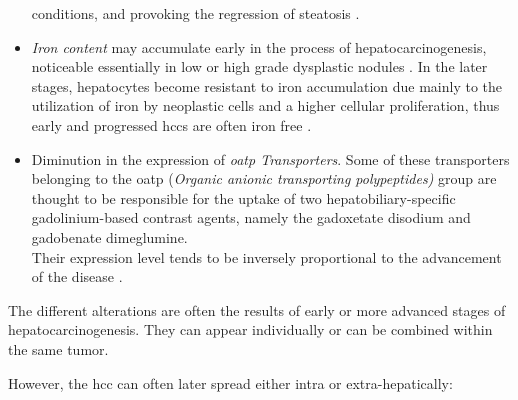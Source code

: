 \begin{itemize}
  conditions, and provoking the regression of steatosis \cite{Kojiro2005, Kutami2000}.
\item
  \emph{Iron content} may accumulate early in the process of
  hepatocarcinogenesis, noticeable essentially in low or high grade
  dysplastic nodules \cite{Kojiro2009}. In the later
  stages, hepatocytes become resistant to iron accumulation due mainly
  to the utilization of iron by neoplastic cells and a higher cellular
  proliferation, thus early and progressed \ac{hcc}s are often iron free
  \cite{Gurusamy2007}.
\item
  Diminution in the expression of \emph{	\ac{oatp} Transporters}. Some of
  these transporters belonging to the \ac{oatp} (\emph{Organic anionic
    transporting polypeptides)} group are thought to be responsible for
  the uptake of two hepatobiliary-specific gadolinium-based contrast
  agents, namely the gadoxetate disodium and gadobenate dimeglumine.\\
  Their expression level tends to be inversely proportional to the
  advancement of the disease \cite{Kitao2011,Tsuboyama2010}.
\end{itemize}

The different alterations are often the results of early or more
advanced stages of hepatocarcinogenesis. They can appear individually or
can be combined within the same tumor.

However, the \ac{hcc} can often later spread either intra or
extra-hepatically:

